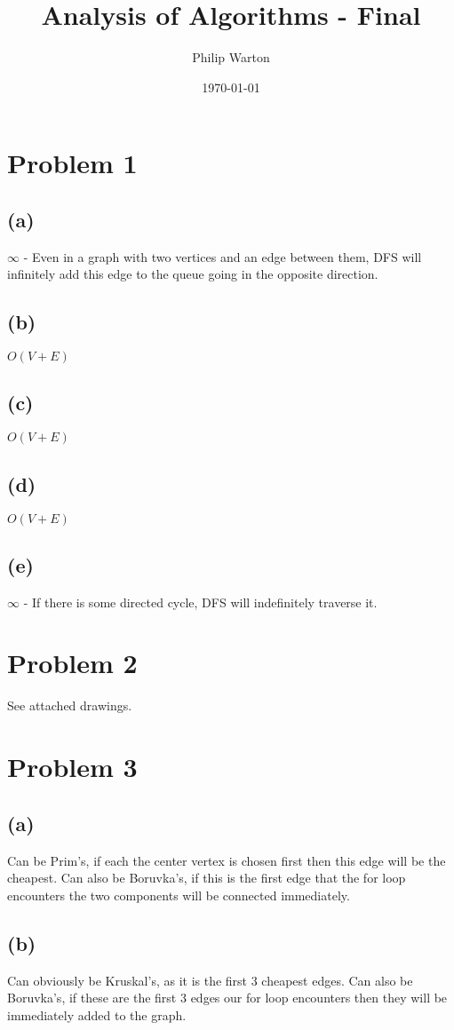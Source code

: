 \documentclass{article}
\theoremstyle{definition}
\begin{document}
\title{Analysis of Algorithms - Final}
\author{Philip Warton}
\date{\today}
\maketitle
\section*{Problem 1}
\subsection*{(a)}
$\infty$ - Even in a graph with two vertices and an edge between them, DFS will infinitely add this edge to the queue going in the opposite direction.
\subsection*{(b)}
$O(V + E)$
\subsection*{(c)}
$O(V + E)$
\subsection*{(d)}
$O(V + E)$
\subsection*{(e)}
$\infty$ - If there is some directed cycle, DFS will indefinitely traverse it.
\section*{Problem 2}
See attached drawings.
\section*{Problem 3}
\subsection*{(a)}
Can be Prim's, if each the center vertex is chosen first then this edge will be the cheapest.
Can also be Boruvka's, if this is the first edge that the for loop encounters the two components will be connected immediately.
\subsection*{(b)}
Can obviously be Kruskal's, as it is the first 3 cheapest edges. Can also be Boruvka's, if these are the first 3 edges our for loop encounters then 
they will be immediately added to the graph.
\end{document}
